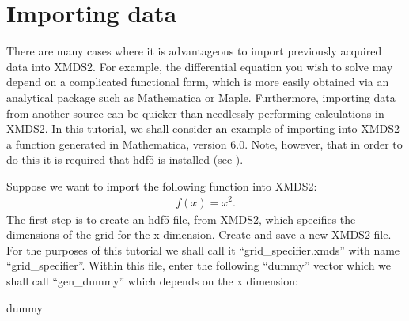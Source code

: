 \documentclass[letterpaper,10pt,english]{sphinxmanual}
\begin{document}
\ignorespaces 

\section{Importing data}
\label{\detokenize{advanced_topics:importing-data}}\label{\detokenize{advanced_topics:importing}}\label{\detokenize{advanced_topics:index-1}}
\sphinxAtStartPar
There are many cases where it is advantageous to import previously acquired data into XMDS2. For example, the differential equation you wish to solve may depend on a complicated functional form, which is more easily obtained via an analytical package such as Mathematica or Maple. Furthermore, importing data from another source can be quicker than needlessly performing calculations in XMDS2. In this tutorial, we shall consider an example of importing into XMDS2 a function generated in Mathematica, version 6.0. Note, however, that in order to do this it is required that hdf5 is installed (see ).

\sphinxAtStartPar
Suppose we want to import the following function into XMDS2:
\begin{equation*}
\begin{split}f(x) = x^2.\end{split}
\end{equation*}
\sphinxAtStartPar
The first step is to create an hdf5 file, from XMDS2, which specifies the dimensions of the grid for the x dimension. Create and save a new XMDS2 file. For the purposes of this tutorial we shall call it “grid\_specifier.xmds” with name “grid\_specifier”. Within this file, enter the following “dummy” vector \sphinxhyphen{} which we shall call “gen\_dummy” \sphinxhyphen{} which depends on the x dimension:

\begin{sphinxVerbatim}[commandchars=\\\{\}]
   
  dummy
  \PYG{c+cp}{\PYGZlt{}![CDATA[}
      
      \PYG{c+cp}{]]\PYGZgt{}}
\end{sphinxVerbatim}
\end{document}
